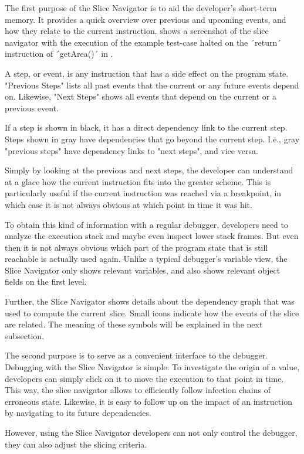 The first purpose of the Slice Navigator is to aid the developer's short-term memory.
It provides a quick overview over previous and upcoming events, and how they relate to the current instruction.
 shows a screenshot of the slice navigator with the execution of the example test-case halted on the ´return´ instruction of ´getArea()´ in .

A step, or event, is any instruction that has a side effect on the program state.
"Previous Steps" lists all past events that the current or any future events depend on.
Likewise, "Next Steps" shows all events that depend on the current or a previous event.

If a step is shown in black, it has a direct dependency link to the current step.
Steps shown in gray have dependencies that go beyond the current step.
I.e., gray "previous steps" have dependency links to "next steps", and vice versa.

Simply by looking at the previous and next steps, the developer can understand at a glace how the current instruction fits into the greater scheme.
This is particularly useful if the current instruction was reached via a breakpoint, in which case it is not always obvious at which point in time it was hit.

To obtain this kind of information with a regular debugger, developers need to analyze the execution stack and maybe even inspect lower stack frames.
But even then it is not always obvious which part of the program state that is still reachable is actually used again.
Unlike a typical debugger's variable view, the Slice Navigator only shows relevant variables, and also shows relevant object fields on the first level.

Further, the Slice Navigator shows details about the dependency graph that was used to compute the current slice.
Small icons indicate how the events of the slice are related.
The meaning of these symbols will be explained in the next subsection.

The second purpose is to serve as a convenient interface to the debugger.
Debugging with the Slice Navigator is simple:
To investigate the origin of a value, developers can simply click on it to move the execution to that point in time.
This way, the slice navigator allows to efficiently follow infection chains of erroneous state.
Likewise, it is easy to follow up on the impact of an instruction by navigating to its future dependencies.

However, using the Slice Navigator developers can not only control the debugger, they can also adjust the slicing criteria.

